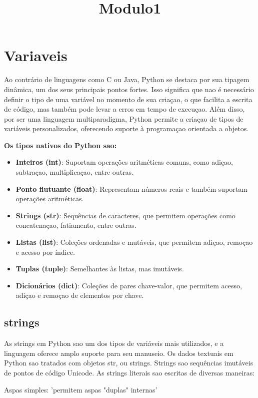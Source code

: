 \documentclass{article}
\date{} %
\title{Modulo1}
\begin{document}
\maketitle
\tableofcontents
\newpage

\section{Variaveis}
Ao contrário de linguagens como C ou Java, Python se destaca por sua tipagem dinâmica, um dos seus principais pontos fortes. Isso significa que nao é necessário definir o tipo de uma variável no momento de sua criaçao, o que facilita a escrita de código, mas também pode levar a erros em tempo de execuçao. Além disso, por ser uma linguagem multiparadigma, Python permite a criaçao de tipos de variáveis personalizados, oferecendo suporte à programaçao orientada a objetos.

\textbf{Os tipos nativos do Python sao:} \begin{itemize} \item \textbf{Inteiros (int)}: Suportam operações aritméticas comuns, como adiçao, subtraçao, multiplicaçao, entre outras. \item \textbf{Ponto flutuante (float)}: Representam números reais e também suportam operações aritméticas. \item \textbf{Strings (str)}: Sequências de caracteres, que permitem operações como concatenaçao, fatiamento, entre outras. \item \textbf{Listas (list)}: Coleções ordenadas e mutáveis, que permitem adiçao, remoçao e acesso por índice. \item \textbf{Tuplas (tuple)}: Semelhantes às listas, mas imutáveis. \item \textbf{Dicionários (dict)}: Coleções de pares chave-valor, que permitem acesso, adiçao e remoçao de elementos por chave. \end{itemize}

\subsection{strings}
As strings em Python sao um dos tipos de variáveis mais utilizados, e a linguagem oferece amplo suporte para seu manuseio.
Os dados textuais em Python sao tratados com objetos str, ou strings. Strings sao sequências imutáveis de pontos de código Unicode. As strings literais sao escritas de diversas maneiras:

Aspas simples: 'permitem aspas "duplas" internas'
\end{document}
